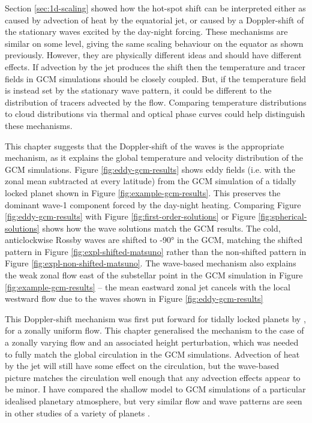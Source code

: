Section \ref{sec:1d-scaling} showed how the hot-spot shift can be interpreted either as caused by advection of heat by the equatorial jet, or caused by a Doppler-shift of the stationary waves excited by the day-night forcing. These mechanisms are similar on some level, giving the same scaling behaviour on the equator as shown previously. However, they are physically different ideas and should have different effects. If advection by the jet produces the shift then the temperature and tracer fields in GCM simulations should be closely coupled. But, if the temperature field is instead set by the stationary wave pattern, it could be different to the distribution of tracers advected by the flow. Comparing temperature distributions to cloud distributions via thermal and optical phase curves could help distinguish these mechanisms.

This chapter suggests that the Doppler-shift of the waves is the appropriate mechanism, as it explains the global temperature and velocity distribution of the GCM simulations. Figure \ref{fig:eddy-gcm-results} shows eddy fields (i.e. with the zonal mean subtracted at every latitude) from the GCM simulation of a tidally locked planet shown in Figure \ref{fig:example-gcm-results}. This preserves the dominant wave-1 component forced by the day-night heating. Comparing Figure \ref{fig:eddy-gcm-results} with Figure \ref{fig:first-order-solutions} or Figure \ref{fig:spherical-solutions} shows how the wave solutions match the GCM results. The cold, anticlockwise Rossby waves are shifted to \ang{-90} in the GCM, matching the shifted pattern in Figure \ref{fig:expl-shifted-matsuno} rather than the non-shifted pattern in Figure \ref{fig:expl-non-shifted-matsuno}. The wave-based mechanism also explains the weak zonal flow east of the substellar point in the GCM simulation in Figure \ref{fig:example-gcm-results} --  the mean eastward zonal jet cancels with the local westward flow due to the waves shown in Figure \ref{fig:eddy-gcm-results}

This Doppler-shift mechanism was first put forward for tidally locked planets by \citet{tsai2014three}, for a zonally uniform flow. This chapter generalised the mechanism to the case of a zonally varying flow and an associated height perturbation, which was needed to fully match the global circulation in the GCM simulations. Advection of heat by the jet will still have some effect on the circulation, but the wave-based picture matches the circulation well enough that any advection effects appear to be minor. I have compared the shallow model to GCM simulations of a particular idealised planetary atmosphere, but very similar flow and wave patterns are seen in other studies of a variety of planets  \citep{charnay20153d, heng2015review, kataria2014atmospheric, mayne2017hotjupiter, boutle2017proxima}.

